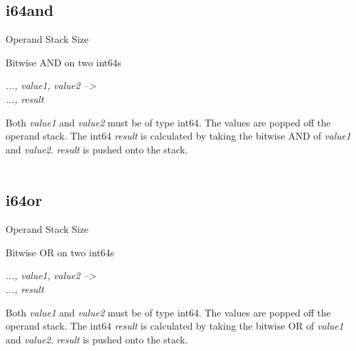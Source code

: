 \documentclass[12pt]{article}
\begin{document}
		\newpage
		\subsection*{i64and}
			\begin{labeling}{Operand Stack Size}
				\item [\textbf{Operation}] Bitwise AND on two int64s
				\item [\textbf{Format}] 
				\item [\textbf{Operand Stack}] \textit{..., value1, value2 --\textgreater } \\
										\textit{..., result}
				\item [\textbf{Description}] Both \textit{value1} and \textit{value2} must be of type int64. The values are popped off the operand stack. The int64 \textit{result} is calculated by taking the bitwise AND of \textit{value1} and \textit{value2}. \textit{result} is pushed onto the stack. \\ \\
			\end{labeling}	
			
		\newpage
		\subsection*{i64or}
			\begin{labeling}{Operand Stack Size}
				\item [\textbf{Operation}] Bitwise OR on two int64s
				\item [\textbf{Format}] 
				\item [\textbf{Operand Stack}] \textit{..., value1, value2 --\textgreater } \\
										\textit{..., result}
				\item [\textbf{Description}] Both \textit{value1} and \textit{value2} must be of type int64. The values are popped off the operand stack. The int64 \textit{result} is calculated by taking the bitwise OR of \textit{value1} and \textit{value2}. \textit{result} is pushed onto the stack. \\ \\
			\end{labeling}	
			
		\newpage
\end{document}
